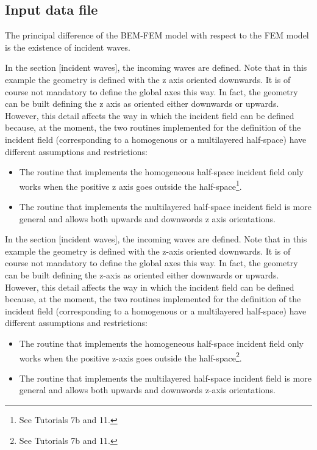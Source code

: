 \documentclass[a4]{article}
\begin{document}
\subsection{Input data file}

The principal difference of the BEM-FEM model with respect to the FEM model is the existence of incident waves.

In the section [incident waves], the incoming waves are defined. Note that in this example the geometry is defined with the z axis oriented downwards. It is of course not mandatory to define the global axes this way. In fact, the geometry can be built defining the z axis as oriented either downwards or upwards. However, this detail affects the way in which the incident field can be defined because, at the moment, the two routines implemented for the definition of the incident field (corresponding to a homogenous or a multilayered half-space) have different assumptions and restrictions:

\begin{itemize}
\item The routine that implements the homogeneous half-space incident field only works when the positive z axis goes outside the half-space\footnote{See Tutorials 7b and 11.}.

\item The routine that implements the multilayered half-space incident field is more general and allows both upwards and downwords z axis orientations.
\end{itemize}

In the section [incident waves], the incoming waves are defined. Note that in this example the geometry is defined with the z-axis oriented downwards. It is of course not mandatory to define the global axes this way. In fact, the geometry can be built defining the z-axis as oriented either downwards or upwards. However, this detail affects the way in which the incident field can be defined because, at the moment, the two routines implemented for the definition of the incident field (corresponding to a homogenous or a multilayered half-space) have different assumptions and restrictions:

\begin{itemize}
\item The routine that implements the homogeneous half-space incident field only works when the positive z-axis goes outside the half-space\footnote{See Tutorials 7b and 11.}.
\item The routine that implements the multilayered half-space incident field is more general and allows both upwards and downwords z-axis orientations.
\end{itemize}
\end{document}

